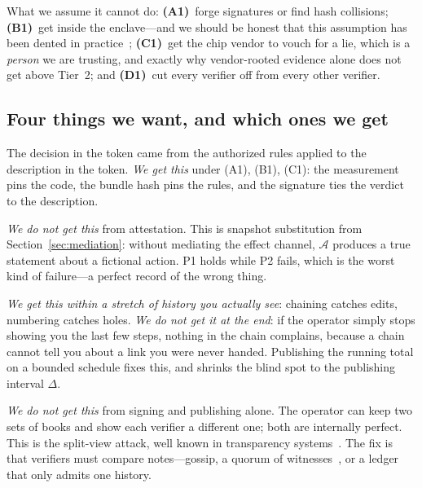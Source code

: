 \documentclass[11pt]{article}
\begin{document}
What we assume it cannot do: \textbf{(A1)}~forge signatures or find hash
collisions; \textbf{(B1)}~get inside the enclave---and we should be honest
that this assumption has been dented in practice~\cite{costan2016,foreshadow};
\textbf{(C1)}~get the chip vendor to vouch for a lie, which is a
\emph{person} we are trusting, and exactly why vendor-rooted evidence alone
does not get above Tier~2; and \textbf{(D1)}~cut every verifier off from every
other verifier.

\subsection{Four things we want, and which ones we get}
\begin{description}[itemsep=2pt,leftmargin=1.4em]
\item[P1 (The verdict is real).] The decision in the token came from the
authorized rules applied to the description in the token. \emph{We get this}
under (A1), (B1), (C1): the measurement pins the code, the bundle hash pins
the rules, and the signature ties the verdict to the description.
\item[P2 (The evidence describes what happened).] \emph{We do not get this}
from attestation. This is snapshot substitution from
Section~\ref{sec:mediation}: without mediating the effect channel,
$\mathcal{A}$ produces a true statement about a fictional action. P1 holds
while P2 fails, which is the worst kind of failure---a perfect record of the
wrong thing.
\item[P3 (Nothing was changed or dropped).] \emph{We get this within a stretch
of history you actually see}: chaining catches edits, numbering catches holes.
\emph{We do not get it at the end}: if the operator simply stops showing you
the last few steps, nothing in the chain complains, because a chain cannot
tell you about a link you were never handed. Publishing the running total on a
bounded schedule fixes this, and shrinks the blind spot to the publishing
interval $\Delta$.
\item[P4 (Everyone sees the same history).] \emph{We do not get this} from
signing and publishing alone. The operator can keep two sets of books and show
each verifier a different one; both are internally perfect. This is the
split-view attack, well known in transparency
systems~\cite{rfc6962,ctgossip,chase2016}. The fix is that verifiers must
compare notes---gossip, a quorum of witnesses~\cite{chainiac}, or a ledger
that only admits one history.
\end{description}
\end{document}
